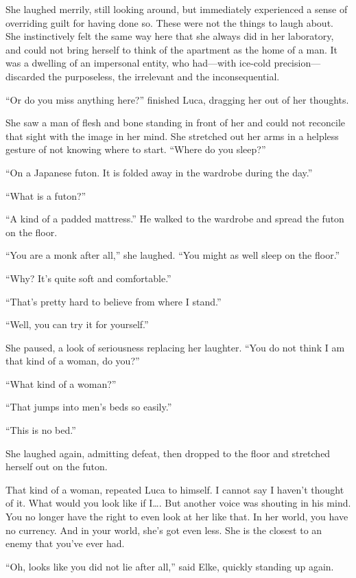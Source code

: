She laughed merrily, still looking around, but immediately experienced a sense of overriding guilt for having done so. These were not the things to laugh about. She instinctively felt the same way here that she always did in her laboratory, and could not bring herself to think of the apartment as the home of a man. It was a dwelling of an impersonal entity, who had---with ice-cold precision---discarded the purposeless, the irrelevant and the inconsequential.

``Or do you miss anything here?'' finished Luca, dragging her out of her thoughts.

She saw a man of flesh and bone standing in front of her and could not reconcile that sight with the image in her mind. She stretched out her arms in a helpless gesture of not knowing where to start. ``Where do you sleep?''

``On a Japanese futon. It is folded away in the wardrobe during the day.''

``What is a futon?''

``A kind of a padded mattress.'' He walked to the wardrobe and spread the futon on the floor.

``You are a monk after all,'' she laughed. ``You might as well sleep on the floor.''

``Why? It's quite soft and comfortable.''

``That's pretty hard to believe from where I stand.''

``Well, you can try it for yourself.''

She paused, a look of seriousness replacing her laughter. ``You do not think I am that kind of a woman, do you?''

``What kind of a woman?''

``That jumps into men's beds so easily.''

``This is no bed.''

She laughed again, admitting defeat, then dropped to the floor and stretched herself out on the futon.

That kind of a woman, repeated Luca to himself. I cannot say I haven't thought of it. What would you look like if I\ldots. But another voice was shouting in his mind. You no longer have the right to even look at her like that. In her world, you have no currency. And in your world, she's got even less. She is the closest to an enemy that you've ever had.

``Oh, looks like you did not lie after all,'' said Elke, quickly standing up again.

